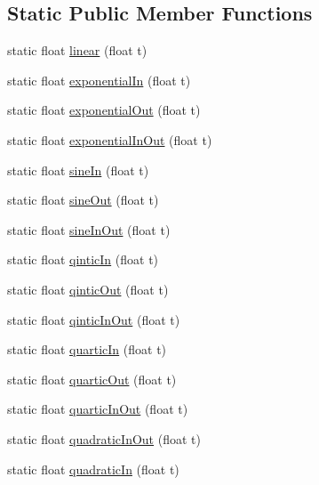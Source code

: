 \subsection*{Static Public Member Functions}
\begin{DoxyCompactItemize}
\item 
static float \mbox{\hyperlink{classnjli_1_1_action_ae86773a5e972de01ad5203b333c01bcc}{linear}} (float t)
\item 
static float \mbox{\hyperlink{classnjli_1_1_action_afb82d5679cbf9870b790347db75f4b93}{exponential\+In}} (float t)
\item 
static float \mbox{\hyperlink{classnjli_1_1_action_aa510c92b26f6f456f7d8cafd5eea66e7}{exponential\+Out}} (float t)
\item 
static float \mbox{\hyperlink{classnjli_1_1_action_a5454f0bc57ff81f3fc268e9561f4941b}{exponential\+In\+Out}} (float t)
\item 
static float \mbox{\hyperlink{classnjli_1_1_action_a4fbf94cf5e13c8b4556f1907086f2b65}{sine\+In}} (float t)
\item 
static float \mbox{\hyperlink{classnjli_1_1_action_a6c6b65d55075ec64e5fb1f55d9d61686}{sine\+Out}} (float t)
\item 
static float \mbox{\hyperlink{classnjli_1_1_action_a7b3215f5fb1f5410f22159133068d56a}{sine\+In\+Out}} (float t)
\item 
static float \mbox{\hyperlink{classnjli_1_1_action_a98487f4c9e65ac3541506488171c0c5f}{qintic\+In}} (float t)
\item 
static float \mbox{\hyperlink{classnjli_1_1_action_a14c373ab33f7e878e83f33bcf9844b72}{qintic\+Out}} (float t)
\item 
static float \mbox{\hyperlink{classnjli_1_1_action_a3949e3edf9e27c8e0bec91d4a482fb02}{qintic\+In\+Out}} (float t)
\item 
static float \mbox{\hyperlink{classnjli_1_1_action_a329377b16fb22814ab3c2a3325c8661d}{quartic\+In}} (float t)
\item 
static float \mbox{\hyperlink{classnjli_1_1_action_ad45f3afb32fe4b25900fae78faa1fc8b}{quartic\+Out}} (float t)
\item 
static float \mbox{\hyperlink{classnjli_1_1_action_a6c8c029d9eecd90f2c267319a88d0c35}{quartic\+In\+Out}} (float t)
\item 
static float \mbox{\hyperlink{classnjli_1_1_action_ae511e66934d161fc157bb9c564e7c2be}{quadratic\+In\+Out}} (float t)
\item 
static float \mbox{\hyperlink{classnjli_1_1_action_a8aa0baf279e5f063495bd974b312baae}{quadratic\+In}} (float t)

\end{DoxyCompactItemize}
